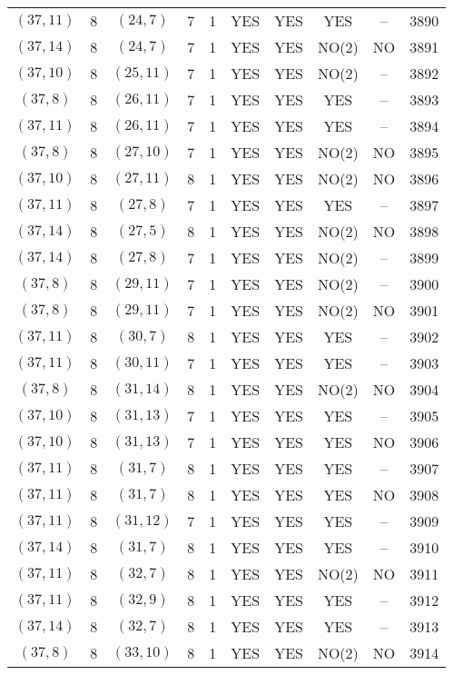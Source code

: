 \begin{longtable}{|c|c|c|c|c|c|c|c|c|c|}
$(37, 11)$ & 8 & $(24, 7)$ & 7 & 1 & YES & YES & YES & -- & 3890\\
$(37, 14)$ & 8 & $(24, 7)$ & 7 & 1 & YES & YES & NO(2) & NO & 3891\\
$(37, 10)$ & 8 & $(25, 11)$ & 7 & 1 & YES & YES & NO(2) & -- & 3892\\
$(37, 8)$ & 8 & $(26, 11)$ & 7 & 1 & YES & YES & YES & -- & 3893\\
$(37, 11)$ & 8 & $(26, 11)$ & 7 & 1 & YES & YES & YES & -- & 3894\\
$(37, 8)$ & 8 & $(27, 10)$ & 7 & 1 & YES & YES & NO(2) & NO & 3895\\
$(37, 10)$ & 8 & $(27, 11)$ & 8 & 1 & YES & YES & NO(2) & NO & 3896\\
$(37, 11)$ & 8 & $(27, 8)$ & 7 & 1 & YES & YES & YES & -- & 3897\\
$(37, 14)$ & 8 & $(27, 5)$ & 8 & 1 & YES & YES & NO(2) & NO & 3898\\
$(37, 14)$ & 8 & $(27, 8)$ & 7 & 1 & YES & YES & NO(2) & -- & 3899\\
$(37, 8)$ & 8 & $(29, 11)$ & 7 & 1 & YES & YES & NO(2) & -- & 3900\\
$(37, 8)$ & 8 & $(29, 11)$ & 7 & 1 & YES & YES & NO(2) & NO & 3901\\
$(37, 11)$ & 8 & $(30, 7)$ & 8 & 1 & YES & YES & YES & -- & 3902\\
$(37, 11)$ & 8 & $(30, 11)$ & 7 & 1 & YES & YES & YES & -- & 3903\\
$(37, 8)$ & 8 & $(31, 14)$ & 8 & 1 & YES & YES & NO(2) & NO & 3904\\
$(37, 10)$ & 8 & $(31, 13)$ & 7 & 1 & YES & YES & YES & -- & 3905\\
$(37, 10)$ & 8 & $(31, 13)$ & 7 & 1 & YES & YES & YES & NO & 3906\\
$(37, 11)$ & 8 & $(31, 7)$ & 8 & 1 & YES & YES & YES & -- & 3907\\
$(37, 11)$ & 8 & $(31, 7)$ & 8 & 1 & YES & YES & YES & NO & 3908\\
$(37, 11)$ & 8 & $(31, 12)$ & 7 & 1 & YES & YES & YES & -- & 3909\\
$(37, 14)$ & 8 & $(31, 7)$ & 8 & 1 & YES & YES & YES & -- & 3910\\
$(37, 11)$ & 8 & $(32, 7)$ & 8 & 1 & YES & YES & NO(2) & NO & 3911\\
$(37, 11)$ & 8 & $(32, 9)$ & 8 & 1 & YES & YES & YES & -- & 3912\\
$(37, 14)$ & 8 & $(32, 7)$ & 8 & 1 & YES & YES & YES & -- & 3913\\
$(37, 8)$ & 8 & $(33, 10)$ & 8 & 1 & YES & YES & NO(2) & NO & 3914\\

\end{longtable}
